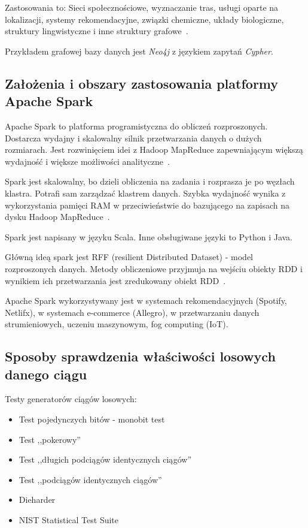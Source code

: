 \documentclass[wi]{zut}
\begin{document}
Zastosowania to: Sieci społecznościowe, wyznaczanie tras, usługi oparte na lokalizacji, systemy rekomendacyjne, związki chemiczne, układy biologiczne, struktury lingwistyczne i inne struktury grafowe~\cite{Jankowski2020_grafowe}.

Przykładem grafowej bazy danych jest \emph{Neo4j} z językiem zapytań \emph{Cypher}.

\subsection{Założenia i obszary zastosowania platformy Apache Spark}

Apache Spark to platforma programistyczna do obliczeń rozproszonych. Dostarcza wydajny i skalowalny silnik przetwarzania danych o dużych rozmiarach. Jest rozwinięciem idei z Hadoop MapReduce zapewniającym większą wydajność i większe możliwości analityczne~\cite{Malachowski_spark}.

Spark jest skalowalny, bo dzieli obliczenia na zadania i rozprasza je po węzłach klastra. Potrafi sam zarządzać klastrem danych. Szybka wydajność wynika z wykorzystania pamięci RAM w przeciwieństwie do bazującego na zapisach na dysku Hadoop MapReduce~\cite{Malachowski_spark}.

Spark jest napisany w języku Scala. Inne obsługiwane języki to Python i Java.

Główną ideą spark jest RFF (resilient Distributed Dataset) - model rozproszonych danych. Metody obliczeniowe przyjmuja na wejściu obiekty RDD i wynikiem ich przetwarzania jest zredukowany obiekt RDD~\cite{Malachowski_spark}.

Apache Spark wykorzystywany jest w systemach rekomendacyjnych (Spotify, Netlifx), w systemach e-commerce (Allegro), w przetwarzaniu danych strumieniowych, uczeniu maszynowym, fog computing (IoT).

\subsection{Sposoby sprawdzenia właściwości losowych danego ciągu}

Testy generatorów ciągów losowych:

\begin{itemize}
    \item Test pojedynczych bitów - monobit test
    \item Test ,,pokerowy''
    \item Test ,,długich podciągów identycznych ciągów''
    \item Test ,,podciągów identycznych ciągów''
    \item Dieharder
    \item NIST Statistical Test Suite \cite{Chocian2020_2}
\end{itemize}
\end{document}
